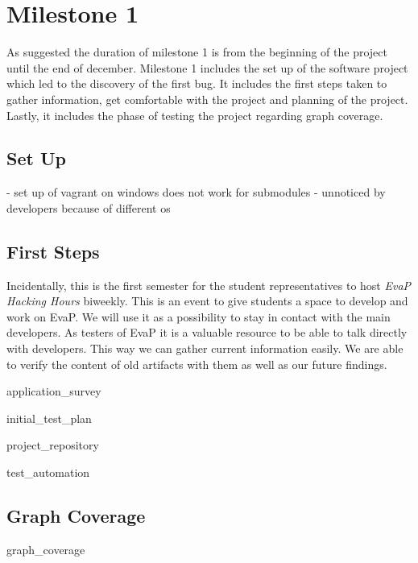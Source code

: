 \section{Milestone 1}
As suggested the duration of milestone 1 is from the beginning of the project until the end of december.
Milestone 1 includes the set up of the software project which led to the discovery of the first bug.
It includes the first steps taken to gather information, get comfortable with the project and planning of the project.
Lastly, it includes the phase of testing the project regarding graph coverage.

\subsection{Set Up}
- set up of vagrant on windows does not work for submodules
- unnoticed by developers because of different os


\subsection{First Steps}
Incidentally, this is the first semester for the student representatives to host \emph{EvaP Hacking Hours} biweekly.
This is an event to give students a space to develop and work on EvaP.
We will use it as a possibility to stay in contact with the main developers.
As testers of EvaP it is a valuable resource to be able to talk directly with developers.
This way we can gather current information easily.
We are able to verify the content of old artifacts with them as well as our future findings.

{application_survey}

{initial_test_plan}

{project_repository}

{test_automation}

\subsection{Graph Coverage}

{graph_coverage}
